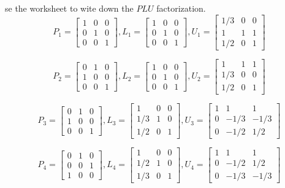 \documentclass[12pt]{article}
\makeatletter
\theoremstyle{homework}
\newenvironment{exercise}[1]
{\def\@currentlabel{#1}\exercisecore}
{\endexercisecore}
\makeatother
\begin{document}
\begin{exercise}

Use the worksheet to wite down the $PLU$ factorization.
\end{exercise}
$$P_1=\begin{bmatrix}
1 & 0 & 0\\
0 & 1 & 0\\
0 & 0 & 1
\end{bmatrix},
L_1=\begin{bmatrix}
1 & 0 & 0\\
0 & 1 & 0\\
0 & 0 & 1
\end{bmatrix},
U_1=\begin{bmatrix}
1/3 & 0 & 0\\
1 & 1 & 1\\
1/2 & 0 & 1
\end{bmatrix}$$

$$P_2=\begin{bmatrix}
0 & 1 & 0\\
1 & 0 & 0\\
0 & 0 & 1
\end{bmatrix},
L_2=\begin{bmatrix}
1 & 0 & 0\\
0 & 1 & 0\\
0 & 0 & 1
\end{bmatrix},
U_2=\begin{bmatrix}
1 & 1 & 1\\
1/3 & 0 & 0\\
1/2 & 0 & 1
\end{bmatrix}$$

$$P_3=\begin{bmatrix}
0 & 1 & 0\\
1 & 0 & 0\\
0 & 0 & 1
\end{bmatrix},
L_3=\begin{bmatrix}
1 & 0 & 0\\
1/3 & 1 & 0\\
1/2 & 0 & 1
\end{bmatrix},
U_3=\begin{bmatrix}
1 & 1 & 1\\
0 & -1/3 & -1/3\\
0 & -1/2 & 1/2
\end{bmatrix}$$

$$P_4=\begin{bmatrix}
0 & 1 & 0\\
0 & 0 & 1\\
1 & 0 & 0
\end{bmatrix},
L_4=\begin{bmatrix}
1 & 0 & 0\\
1/2 & 1 & 0\\
1/3 & 0 & 1
\end{bmatrix},
U_4=\begin{bmatrix}
1 & 1 & 1\\
0 & -1/2 & 1/2\\
0 & -1/3 & -1/3
\end{bmatrix}$$
\end{document}

